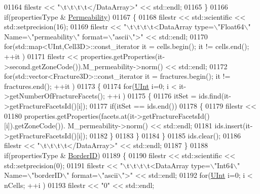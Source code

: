 \begin{DoxyCode}
01164         filestr << \textcolor{stringliteral}{"\(\backslash\)t\(\backslash\)t\(\backslash\)t\(\backslash\)t</DataArray>"} << std::endl;
01165     \}
01166     \textcolor{keywordflow}{if}(propertiesType & \hyperlink{namespaceFVCode3D_ab3abc77722284ce4344be90bb61c1a41a23fa3ea40f896b28978ffc259e5281cf}{Permeability})
01167     \{
01168         filestr << std::scientific << std::setprecision(16);
01169         filestr << \textcolor{stringliteral}{"\(\backslash\)t\(\backslash\)t\(\backslash\)t\(\backslash\)t<DataArray type=\(\backslash\)"Float64\(\backslash\)" Name=\(\backslash\)"permeability\(\backslash\)" format=\(\backslash\)"ascii\(\backslash\)">"} << 
      std::endl;
01170         \textcolor{keywordflow}{for}(std::map<UInt,Cell3D>::const\_iterator it = cells.begin(); it != cells.end(); ++it )
01171             filestr << properties.getProperties(it->second.getZoneCode()).M\_permeability->norm() << 
      std::endl;
01172         \textcolor{keywordflow}{for}(std::vector<Fracture3D>::const\_iterator it = fractures.begin(); it != fractures.end(); ++it )
01173         \{
01174             \textcolor{keywordflow}{for}(\hyperlink{namespaceFVCode3D_a4bf7e328c75d0fd504050d040ebe9eda}{UInt} i=0; i < it->getNumberOfFractureFacets(); ++i )
01175             \{
01176                 itSet = ids.find(it->getFractureFacetsId()[i]);
01177                 \textcolor{keywordflow}{if}(itSet == ids.end())
01178                 \{
01179                       filestr <<
01180                       properties.getProperties(facets.at(it->getFractureFacetsId()[i]).getZoneCode()).
      M\_permeability->norm() << std::endl;
01181                       ids.insert(it->getFractureFacetsId()[i]);
01182                 \}
01183             \}
01184         \}
01185         ids.clear();
01186         filestr << \textcolor{stringliteral}{"\(\backslash\)t\(\backslash\)t\(\backslash\)t\(\backslash\)t</DataArray>"} << std::endl;
01187     \}
01188     \textcolor{keywordflow}{if}(propertiesType & \hyperlink{namespaceFVCode3D_ab3abc77722284ce4344be90bb61c1a41ae672dc66b11cd1f93a00d52d617a1866}{BorderID})
01189     \{
01190         filestr << std::scientific << std::setprecision(0);
01191         filestr << \textcolor{stringliteral}{"\(\backslash\)t\(\backslash\)t\(\backslash\)t\(\backslash\)t<DataArray type=\(\backslash\)"Int64\(\backslash\)" Name=\(\backslash\)"borderID\(\backslash\)" format=\(\backslash\)"ascii\(\backslash\)">"} << std::endl;
01192         \textcolor{keywordflow}{for}(\hyperlink{namespaceFVCode3D_a4bf7e328c75d0fd504050d040ebe9eda}{UInt} i=0; i < nCells; ++i )
01193             filestr << \textcolor{stringliteral}{"0"} << std::endl;

\end{DoxyCode}
